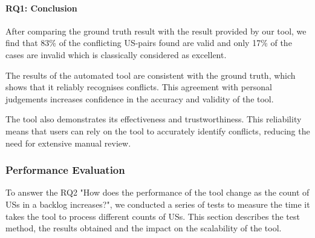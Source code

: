 \paragraph{RQ1: Conclusion}
After comparing the ground truth result with the result provided by our tool, we find that 83\% of the conflicting US-pairs found are valid and only 17\% of the cases are invalid which is classically considered as excellent.

The results of the automated tool are consistent with the ground truth, which shows that it reliably recognises conflicts. This agreement with personal judgements increases confidence in the accuracy and validity of the tool. 

The tool also demonstrates its effectiveness and trustworthiness. This reliability means that users can rely on the tool to accurately identify conflicts, reducing the need for extensive manual review. 
\subsubsection*{Performance Evaluation}
To answer the RQ2 "How does the performance of the tool change as the count of USs in a backlog increases?", we conducted a series of tests to measure the time it takes the tool to process different counts of USs. This section describes the test method, the results obtained and the impact on the scalability of the tool.
